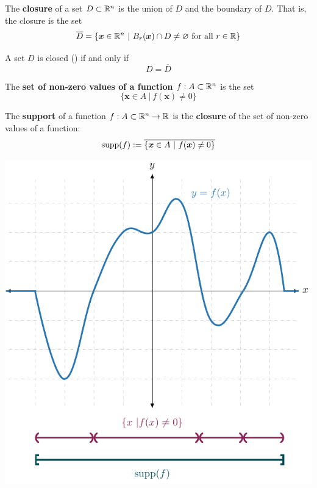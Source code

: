     \begin{definition}
    The \textbf{closure} of a set $D \subset \mathbb{R}^n$ is the union of $D$ and the boundary of $D$.  That is, the closure is the set $$\overline{D} = \{\bm{x} \in \R^n \ | \ B_r(\bm{x}) \cap D \neq \varnothing \textnormal{ for all } r\in\R \}$$  
    \end{definition}

\begin{proposition}
    A set $D$ is closed () if and only if $$D = \overline{D}$$
\end{proposition}

\begin{definition}
    The \textbf{set of non-zero values of a function} $f : A \subset \mathbb{R}^n$ is the set $$\{\bm{x} \in A \ | \ f(\bm{x}) \neq 0\}$$
\end{definition}

\begin{definition}
    The \textbf{support} of a function $f : A \subset \mathbb{R}^n \to \mathbb{R}$ is the \textbf{closure} of the set of non-zero values of a function:
    $$\textnormal{supp}(f) := \overline{\{\bm{x} \in A \ | \ f(\bm{x}) \neq 0\}}$$

\begin{center}
    \includegraphics{chapters/4-IntegrationRn/figures/figures-supportpic.pdf}
\end{center}

\end{definition}


